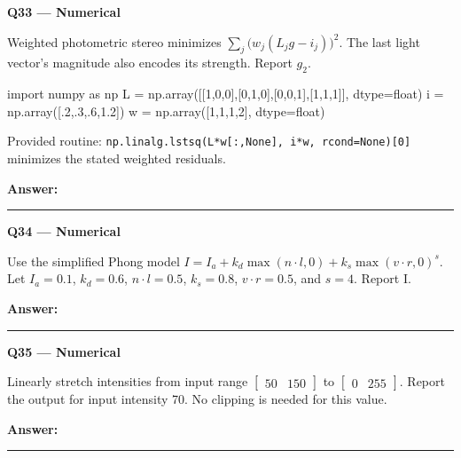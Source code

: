\documentclass[11pt,a4paper]{article}
\begin{document}
\par\vspace{12pt}
\begin{minipage}{\linewidth}
\textbf{Q33 — Numerical}\par\smallskip
Weighted photometric stereo minimizes \(\sum_j\bigl(w_j(L_j g-i_j)\bigr)^2\). The last light vector's magnitude also encodes its strength. Report \(g_2\).


\begin{Code}
import numpy as np
L = np.array([[1,0,0],[0,1,0],[0,0,1],[1,1,1]], dtype=float)
i = np.array([.2,.3,.6,1.2])
w = np.array([1,1,1,2], dtype=float)
\end{Code}


Provided routine: \texttt{np.linalg.lstsq(L*\allowbreak{}w[:,\allowbreak{}None],\allowbreak{} i*\allowbreak{}w,\allowbreak{} rcond=\allowbreak{}None)[0]} minimizes the stated weighted residuals.
\par\medskip\textbf{Answer:} \rule{55mm}{0.4pt}
\end{minipage}
\par\vspace{12pt}
\begin{minipage}{\linewidth}
\textbf{Q34 — Numerical}\par\smallskip
Use the simplified Phong model \(I=I_a+k_d\max(n\cdot l,0)+k_s\max(v\cdot r,0)^s\). Let \(I_a=0.1\),\allowbreak{} \(k_d=0.6\),\allowbreak{} \(n\cdot l=0.5\),\allowbreak{} \(k_s=0.8\),\allowbreak{} \(v\cdot r=0.5\),\allowbreak{} and \(s=4\). Report I.
\par\medskip\textbf{Answer:} \rule{55mm}{0.4pt}
\end{minipage}
\par\vspace{12pt}
\begin{minipage}{\linewidth}
\textbf{Q35 — Numerical}\par\smallskip
Linearly stretch intensities from input range \(\begin{bmatrix}50&150\end{bmatrix}\) to \(\begin{bmatrix}0&255\end{bmatrix}\). Report the output for input intensity 70. No clipping is needed for this value.
\par\medskip\textbf{Answer:} \rule{55mm}{0.4pt}
\end{minipage}
\par\vspace{12pt}
\end{document}
